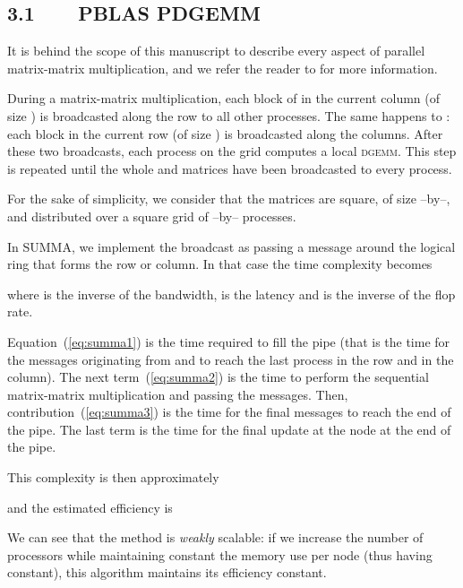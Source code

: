 \documentclass[pdftex,11pt]{article}
\begin{document}
\subsection*{\color{DodgerBlue4}3.1~~~~PBLAS PDGEMM}

It is behind the scope of this manuscript to describe every aspect of
parallel matrix-matrix multiplication, and we refer the reader to
\cite{GeWa:97} for more information.

During a matrix-matrix multiplication, each block of  in the
current column (of size ) is broadcasted along the row to all
other processes. The same happens to : each block in the current
row (of size ) is broadcasted along the columns. After these
two broadcasts, each process on the grid computes a local
\textsc{dgemm}. This step is repeated until the whole  and 
matrices have been broadcasted to every process.

For the sake of simplicity, we consider that the matrices are square,
of size --by--, and distributed over a square grid of
--by-- processes.

In SUMMA, we implement the broadcast as passing a message around the
logical ring that forms the row or column. In that case the time
complexity becomes











where  is the inverse of the bandwidth,  is the latency
and  is the inverse of the flop rate.

Equation~(\ref{eq:summa1}) is the time required to fill the pipe (that
is the time for the messages originating from  and  to reach the
last process in the row and in the column). The next
term~(\ref{eq:summa2}) is the time to perform the sequential
matrix-matrix multiplication and passing the messages. Then,
contribution~(\ref{eq:summa3}) is the time for the final messages to
reach the end of the pipe. The last term is the time for the final
update at the node at the end of the pipe.

This complexity is then approximately



and the estimated efficiency is



We can see that the method is \textit{weakly} scalable: if we increase
the number of processors while maintaining constant the memory use per
node (thus having  constant), this algorithm
maintains its efficiency constant.
\end{document}
